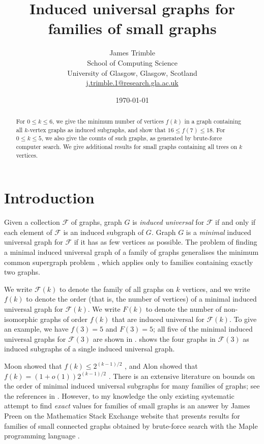 \documentclass[12pt]{article}
\title{Induced universal graphs for families of small graphs}
\author{
        James Trimble \\
                School of Computing Science\\
        University of Glasgow, Glasgow, Scotland \\
        \href{mailto:j.trimble.1@research.gla.ac.uk}{j.trimble.1@research.gla.ac.uk}
}
\date{\today}
\newcommand{\calF}{\ensuremath{\mathcal{F}}}
\begin{document}
\maketitle
%
\begin{abstract}
For $0 \leq k \leq 6$, we give the minimum number of vertices $f(k)$ in a graph containing all
$k$-vertex graphs as induced subgraphs, and show
that $16 \leq f(7) \leq 18$.  For $0 \leq k \leq 5$, we also give the counts of
such graphs, as generated by brute-force computer search.  We give additional
results for small graphs containing all trees on $k$ vertices.
\end{abstract}

\section{Introduction}

Given a collection $\calF$ of graphs, graph $G$ is \emph{induced universal} for
$\calF$ if and only if each element of $\calF$ is an induced subgraph of $G$.
Graph $G$ is a \emph{minimal} induced universal graph for $\calF$ if it has as
few vertices as possible.  The problem of finding a minimal induced universal graph
of a family of graphs generalises the minimum common supergraph problem
\cite{DBLP:journals/computing/BunkeJK00}, which applies only to families
containing exactly two graphs.

We write $\calF(k)$ to denote the family of all graphs on $k$ vertices,
and we write $f(k)$ to denote the order (that is, the
number of vertices) of a minimal induced universal graph for $\calF(k)$.
We write $F(k)$ to denote the number of non-isomorphic graphs of order $f(k)$
that are induced universal for $\calF(k)$.
To give an example, we have $f(3)=5$ and $F(3)=5$; all five of the minimal
induced universal graphs
for $\calF(3)$ are shown in .  shows the four
graphs in $\calF(3)$ as induced subgraphs of a single induced universal graph.

Moon showed that $f(k) \leq 2^{(k-1)/2}$
\cite{moon_1965}, and Alon showed that $f(k) = (1 + o(1))2^{(k-1)/2}$
\cite{alon2017asymptotically}.  There is an extensive literature on bounds on
the order of minimal induced universal subgraphs for many families of graphs;
see the references in \cite{alon2017asymptotically}.
However, to my knowledge the only
existing systematic attempt to find \emph{exact} values for families of small
graphs is an answer by James Preen on the Mathematics Stack Exchange website that
presents results for families of small connected graphs obtained by brute-force
search with the Maple programming language \cite{preen_math_se}.
\end{document}
